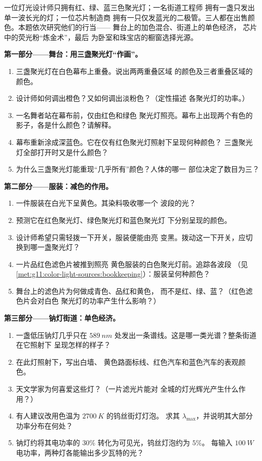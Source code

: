 \begin{problem}
\label{pb:g11:color-light-sources:1}
一位灯光设计师只拥有红、绿、蓝三色聚光灯；一名街道工程师
拥有一盏只发出单一波长光的灯；一位芯片制造商
拥有一只仅发蓝光的二极管。三人都在出售颜色。本题依次研究他们的行当——
舞台上的加色混合、街道上的单色经济，
芯片中的荧光粉“炼金术”，最后
为卧室和珠宝店的橱窗选择光源。

\medskip
\noindent\textbf{第一部分——舞台：用三盏聚光灯“作画”。}
\begin{enumerate}
  \item 三盏聚光灯在白色幕布上重叠。说出两两重叠区域
        的颜色及三者重叠区域的颜色。
  \item 设计师如何调出橙色？又如何调出淡粉色？（定性描述
        各聚光灯的功率。）
  \item 一名舞者站在幕布前，仅由红色和绿色
        聚光灯照亮。幕布上出现两个有色的影子，各是什么颜色？请解释。
  \item 幕布重新涂成深蓝色。它在仅有红色聚光灯照射下呈现何种颜色？
        三盏聚光灯全部打开时又是什么颜色？
  \item 为什么三盏聚光灯能重现“几乎所有”颜色？人体的哪一
        部位决定了数目为三？
\end{enumerate}

\medskip
\noindent\textbf{第二部分——服装：减色的作用。}
\begin{enumerate}[resume]
  \item 一件服装在白光下呈黄色。其染料吸收哪一个
        波段的光？
  \item 预测它在红色聚光灯、绿色聚光灯和蓝色聚光灯
        下分别呈现的颜色。
  \item 设计师希望只需轻拨一下开关，服装便能由亮
        变黑。拨动这一下开关，应切换到哪一盏聚光灯？
  \item 一片品红色滤色片被推到照亮
        黄色服装的白色聚光灯前。追踪各波段
        （见\cref{met:g11:color-light-sources:bookkeeping}）：服装呈何种颜色？
  \item 舞台上的滤色片为何做成青色、品红和黄色，
        而不是红、绿、蓝？（红色滤色片会对白色
        聚光灯的功率产生什么影响？）
\end{enumerate}

\medskip
\noindent\textbf{第三部分——钠灯街道：单色经济。}
\begin{enumerate}[resume]
  \item 一盏低压钠灯几乎只在
        $\qty{589}{nm}$ 处发出一条谱线。这是哪一类光谱？整条街道在它照射下
        呈现怎样的样子？
  \item 在此灯照射下，写出白墙、
        黄色路面标线、红色汽车和蓝色汽车的表观颜色。
  \item 天文学家为何喜爱这些灯？（一片滤光片能对
        全城的灯光辉光产生什么作用？）
  \item 有人建议改用色温为 $\qty{2700}{K}$ 的钨丝街灯灯泡。
        求其 $\lambda_{\max}$，并说明其大部分功率分布在何处？
  \item 钠灯约将其电功率的 $30\%$
        转化为可见光，钨丝灯泡约为 $5\%$。
        每输入 $\qty{100}{W}$ 电功率，两种灯各能输出多少瓦特的光？
\end{enumerate}


\end{problem}
